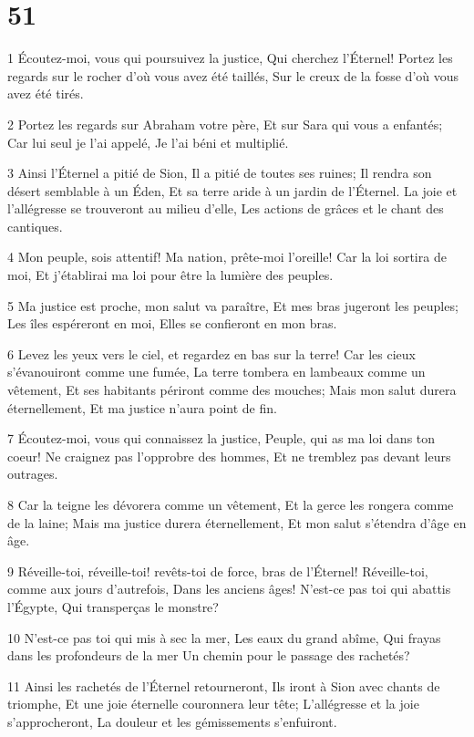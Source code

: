 \chapter{51}

\par 1 Écoutez-moi, vous qui poursuivez la justice, Qui cherchez l'Éternel! Portez les regards sur le rocher d'où vous avez été taillés, Sur le creux de la fosse d'où vous avez été tirés.
\par 2 Portez les regards sur Abraham votre père, Et sur Sara qui vous a enfantés; Car lui seul je l'ai appelé, Je l'ai béni et multiplié.
\par 3 Ainsi l'Éternel a pitié de Sion, Il a pitié de toutes ses ruines; Il rendra son désert semblable à un Éden, Et sa terre aride à un jardin de l'Éternel. La joie et l'allégresse se trouveront au milieu d'elle, Les actions de grâces et le chant des cantiques.
\par 4 Mon peuple, sois attentif! Ma nation, prête-moi l'oreille! Car la loi sortira de moi, Et j'établirai ma loi pour être la lumière des peuples.
\par 5 Ma justice est proche, mon salut va paraître, Et mes bras jugeront les peuples; Les îles espéreront en moi, Elles se confieront en mon bras.
\par 6 Levez les yeux vers le ciel, et regardez en bas sur la terre! Car les cieux s'évanouiront comme une fumée, La terre tombera en lambeaux comme un vêtement, Et ses habitants périront comme des mouches; Mais mon salut durera éternellement, Et ma justice n'aura point de fin.
\par 7 Écoutez-moi, vous qui connaissez la justice, Peuple, qui as ma loi dans ton coeur! Ne craignez pas l'opprobre des hommes, Et ne tremblez pas devant leurs outrages.
\par 8 Car la teigne les dévorera comme un vêtement, Et la gerce les rongera comme de la laine; Mais ma justice durera éternellement, Et mon salut s'étendra d'âge en âge.
\par 9 Réveille-toi, réveille-toi! revêts-toi de force, bras de l'Éternel! Réveille-toi, comme aux jours d'autrefois, Dans les anciens âges! N'est-ce pas toi qui abattis l'Égypte, Qui transperças le monstre?
\par 10 N'est-ce pas toi qui mis à sec la mer, Les eaux du grand abîme, Qui frayas dans les profondeurs de la mer Un chemin pour le passage des rachetés?
\par 11 Ainsi les rachetés de l'Éternel retourneront, Ils iront à Sion avec chants de triomphe, Et une joie éternelle couronnera leur tête; L'allégresse et la joie s'approcheront, La douleur et les gémissements s'enfuiront.
